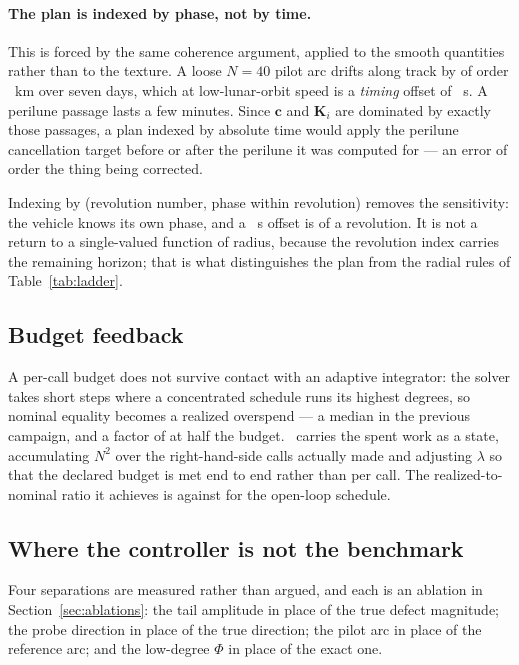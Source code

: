 \paragraph{The plan is indexed by phase, not by time.} This is forced by the
same coherence argument, applied to the smooth quantities rather than to the
texture. A loose $N=40$ pilot arc drifts along track by of order ~km
over seven days, which at low-lunar-orbit speed is a \emph{timing} offset of
~s. A perilune passage lasts a few minutes. Since $\mathbf c$ and
$\mathbf K_i$ are dominated by exactly those passages, a plan indexed by
absolute time would
apply the perilune cancellation target before or after the perilune it was
computed for --- an error of order the thing being corrected.

Indexing by (revolution number, phase within revolution) removes the
sensitivity: the vehicle knows its own phase, and a ~s offset is
 of a revolution. It is not a return to a single-valued function of
radius, because the revolution index carries the remaining horizon; that is
what distinguishes the plan from the radial rules of
Table~\ref{tab:ladder}. 

\subsection{Budget feedback}
\label{sec:controller-feedback}

A per-call budget does not survive contact with an adaptive integrator: the
solver takes short steps where a concentrated schedule runs its highest
degrees, so nominal equality becomes a realized overspend --- a median
 in the previous campaign, and a factor of  at half the
budget. \Cfb\ carries the spent work as a state, accumulating $N^2$ over the
right-hand-side calls actually made and adjusting $\lambda$ so that the
declared budget is met end to end rather than per call.  The realized-to-nominal ratio it achieves is
 against  for the open-loop schedule.

\subsection{Where the controller is not the benchmark}
\label{sec:controller-limits}

Four separations are measured rather than argued, and each is an ablation in
Section~\ref{sec:ablations}: the tail amplitude in place of the true defect
magnitude; the probe direction in place of the true direction; the pilot arc in
place of the reference arc; and the low-degree $\Phi$ in place of the exact
one. 

